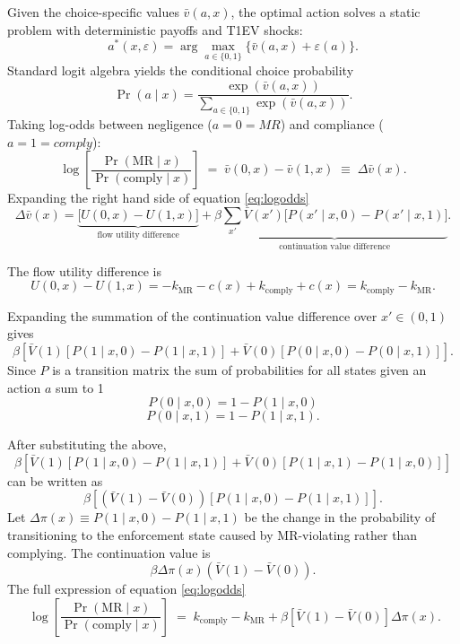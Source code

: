 \documentclass{article}
\begin{document}
Given the choice-specific values $\bar v(a, x)$, the optimal action solves a
static problem with deterministic payoffs and T1EV shocks:
\begin{equation*}
a^*(x, \varepsilon) = \arg\max_{a \in \{0,1\}}
\big\{ \bar v(a, x) + \varepsilon(a) \big\}.
\end{equation*}
Standard logit algebra \cite[Ch.~3]{train2009discrete} yields the conditional
choice probability
\begin{equation}
\Pr(a \mid x) = \frac{\exp\!\left( \bar v(a, x) \right)}
{\sum_{a \in \{0, 1\}} \exp\!\left( \bar v(a, x) \right)}.
\label{eq:ccp}
\end{equation}
Taking log-odds between negligence ($a = 0 = MR$) and compliance ($a = 1 = comply$):
\begin{equation}
\boxed{\;
\log \!\left[ \frac{\Pr(\text{MR} \mid x)}{\Pr(\text{comply} \mid x)} \right]
\;=\; \bar v(0, x) - \bar v(1, x)
\;\equiv\; \Delta \bar v(x).
\;}
\label{eq:logodds}
\end{equation}
Expanding the right hand side of equation \ref{eq:logodds}
\begin{equation}
\Delta \bar v(x) = \underbrace{\big[ U(0, x) - U(1, x) \big]}_{\text{flow utility difference}}
+ \beta \underbrace{\sum_{x'} \bar V(x')
\big[ P(x' \mid x, 0) - P(x' \mid x, 1) \big]}_{\text{continuation value difference}}.
\label{eq:decomp}
\end{equation}

The flow utility difference 
is \[U(0, x) - U(1, x) = -k_{\text{MR}} - c(x) + k_{\text{comply}} + c(x) = k_{\text{comply}}-k_{\text{MR}}.\]

Expanding the summation of the continuation value difference over $x'\in(0,1)$ gives
\[\beta\left[\bar V(1)[P(1\mid x,0)-P(1\mid x,1)]+\bar V(0)[P(0\mid x,0)-P(0\mid x,1)]\right].\]
Since $P$ is a transition matrix the sum of probabilities for all states given an action $a$ sum to 1
\[P(0\mid x,0)=1-P(1\mid x,0)\]
\[P(0\mid x,1)=1-P(1\mid x,1).\]

After substituting the above,
\[\beta\left[\bar V(1)[P(1\mid x,0)-P(1\mid x,1)]+\bar V(0)[P(1\mid x,1)-P(1\mid x,0)]\right]\] can be written as 
\[\beta\left[(\bar V(1)-\bar V(0))[P(1\mid x,0)-P(1\mid x,1)]\right].\]
Let $\Delta\pi(x) \equiv P(1 \mid x,0) - P(1 \mid x, 1)$ be the change in the probability of transitioning to the enforcement state caused by MR-violating rather than complying. The continuation value is
\[\beta \Delta\pi(x) (\bar V(1)-\bar V(0)).\]
The full expression of equation \ref{eq:logodds}
\begin{equation}
    \;
\log \!\left[ \frac{\Pr(\text{MR} \mid x)}{\Pr(\text{comply} \mid x)} \right]
\;=\; k_{\text{comply}}-k_{\text{MR}}+\beta [\bar V(1)-\bar V(0)]\Delta\pi(x).
\label{eq:finalest}
\end{equation}
\end{document}
